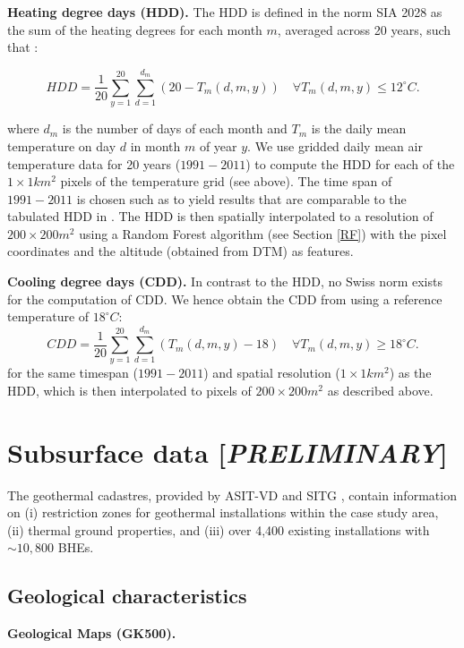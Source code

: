 \textbf{Heating degree days (HDD).}
\label{app:HDD}
The HDD is defined in the norm SIA 2028 as the sum of the heating degrees for each month $m$, averaged across 20 years, such that \cite{sia_klimadaten_2010}: 

\begin{equation}
\label{eq:hdd}
    HDD = \frac{1}{20} \sum_{y=1}^{20} \sum_{d=1}^{d_m} (20 - T_{m}(d, m, y)) \quad \forall T_{m} (d, m, y) \leq 12 ^\circ C. 
\end{equation}

where $d_m$ is the number of days of each month and $T_{m}$ is the daily mean temperature on day $d$ in month $m$ of year $y$. 
We use gridded daily mean air temperature data for 20 years ($1991-2011$) \cite{meteoswiss_daily_2017} to compute the HDD for each of the $1 \times 1 km^2$ pixels of the temperature grid (see above). The time span of  $1991-2011$ is chosen such as to yield results that are comparable to the tabulated HDD in \cite{sia_klimadaten_2010}.
The HDD is then spatially interpolated to a resolution of $200 \times 200m^2$ using a Random Forest algorithm (see Section \ref{RF}) with the pixel coordinates and the altitude (obtained from DTM) as features.

\textbf{Cooling degree days (CDD).} In contrast to the HDD, no Swiss norm exists for the computation of CDD. We hence obtain the CDD from \cite{christenson_climate_2006} using a reference temperature of $18 ^\circ C$:
\begin{equation}
\label{eq:cdd}
    CDD = \frac{1}{20} \sum_{y=1}^{20} \sum_{d=1}^{d_m} (T_{m}(d, m, y)-18) \quad \forall T_{m} (d, m, y) \geq 18 ^\circ C. 
\end{equation}
for the same timespan ($1991-2011$) and spatial resolution ($1 \times 1 km^2$) as the HDD, which is then interpolated to pixels of $200 \times 200m^2$ as described above.

\section{Subsurface data [\textit{PRELIMINARY}]}
\label{data_geo}

The geothermal cadastres, provided by ASIT-VD \cite{asit_vd_cadastre_2019-1} and SITG \cite{sitg_cadastre_2019}, contain information on (i) restriction zones for geothermal installations within the case study area, (ii) thermal ground properties, and (iii) over 4,400 existing installations with $\sim 10,800$ BHEs.

\subsection{Geological characteristics}
\textbf{Geological Maps (GK500).}

